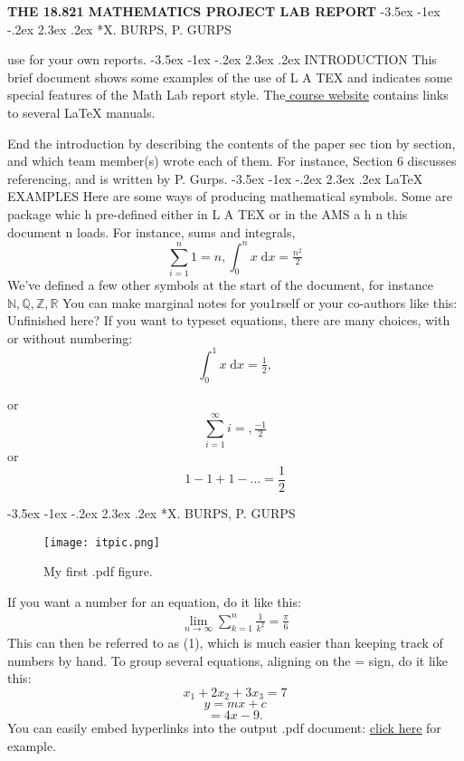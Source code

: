 \documentclass{article}
\makeatletter
\renewcommand\section{\@startsection{section}{1}{\z@}%
	{-3.5ex \@plus -1ex \@minus -.2ex}%
	{2.3ex \@plus.2ex}%
	{\normalfont\large}}
\makeatother
\begin{document}
	\newtheorem{theorem}{Theorem}
	\newtheorem{conjecture}{Conjecture}
 \textbf{THE 18.821 MATHEMATICS PROJECT LAB REPORT}
 \centering\section*{X. BURPS, P. GURPS }	          
 	         
\newline use for your own reports.	
 \centering\section{INTRODUCTION}
 This brief document shows some examples of the use of L A TEX and
 indicates some special features of the Math Lab report style. The\textcolor{blue}{\underline{ \href{http://stellar.mit.edu/S/course/18/sp13/18.821/}{course website}}}
   contains links to several \LaTeX{} manuals.
 
      End the introduction by describing the contents of the paper sec­
 tion by section, and which team member(s) wrote each of them. For
 instance, Section 6 discusses referencing, and is written by P. Gurps.
 \section{\LaTeX{} EXAMPLES}
 Here are some ways of producing mathematical symbols. Some are
 package whic h
 pre-deﬁned either in L A TEX or in the AMS a
 h n this document
 n
 loads. For instance, sums and integrals,\[\sum_{i=1}^{n} 1=n,\int_0^n x\;\mathrm{d}x=\tfrac{n^2}{2}\]
 We’ve deﬁned a few other symbols at the start of the document, for
 instance $\mathbb{N,Q,Z,R}$ You can make marginal notes for you1rself or your
 co-authors like this:
 Unﬁnished here?
 If you want to typeset equations, there are many choices, with or
 without numbering:\[\int_0^1 x\;\mathrm{d}x=\tfrac{1}{2},\] 
 \raggedright or\[\sum_{i=1}^{\infty} i=,\tfrac{-1}{2}\] or\[1-1+1-...=\frac{1}{2}\]
 \date{February 10, 2013} 
 \centering\section*{X. BURPS, P. GURPS}
 \begin{figure}[h]
 	\centering
 	\texttt{[image: itpic.png]}
 	\caption{My ﬁrst .pdf ﬁgure. }
 \end{figure}
 If you want a number for an equation, do it like this:
\begin{align} \lim_{n \to \infty}\sum_{k=1}^{n}\frac{1}{k^2}=\frac{\pi}{6} \end{align}
This can then be referred to as (1), which is much easier than keeping
track of numbers by hand. To group several equations, aligning on the
= sign, do it like this:
\[x_1 + 2x_2 + 3x_3 = 7\]  
\[y = mx + c\]  
\[= 4x - 9.\]
You can easily embed hyperlinks into the output .pdf document:
\textcolor{blue}{\underline{\href{http://stellar.mit.edu/S/course/18/sp13/18.821/}{click here}}} for example.
\end{document}
